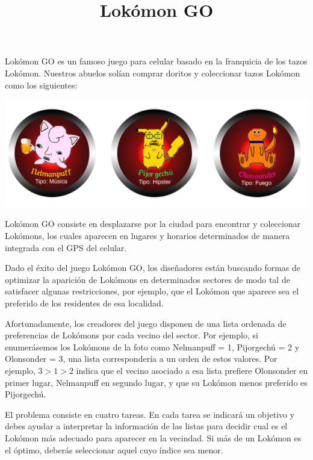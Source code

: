 \documentclass{oci}
\title{Lokómon GO}
\begin{document}
\begin{problemDescription}
Lok\'omon GO es un famoso juego para celular basado en la franquicia de los tazos Lok\'omon. Nuestros abuelos sol\'ian comprar doritos y coleccionar tazos Lok\'omon como los siguientes:

\begin{center}
	\includegraphics[scale=0.4]{lokomons.jpg}
\end{center}

Lok\'omon GO consiste en desplazarse por la ciudad para encontrar y coleccionar Lok\'omons, los cuales aparecen en lugares y horarios determinados de manera integrada con el GPS del celular.

Dado el \'exito del juego Lok\'omon GO, los dise\~nadores est\'an buscando formas de optimizar la aparici\'on de Lok\'omons en determinados sectores de modo tal de satisfacer algunas restricciones, por ejemplo, que el Lok\'omon que aparece sea el preferido de los residentes de esa localidad.

Afortunadamente, los creadores del juego disponen de una lista ordenada de preferencias de Lok\'omons por cada vecino del sector. Por ejemplo, si enumer\'asemos los Lok\'omons de la foto como Nelmanpuff = 1, Pijorgech\'u = 2 y Olonsonder = 3, una lista corresponder\'ia a un orden de estos valores. Por ejemplo, $3 > 1 > 2$ indica que el vecino asociado a esa lista prefiere Olonsonder en primer lugar, Nelmanpuff en segundo lugar, y que su Lok\'omon menos preferido es Pijorgech\'u.

El problema consiste en cuatro tareas. En cada tarea se indicar\'a un objetivo y debes ayudar a interpretar la informaci\'on de las listas para decidir cual es el Lok\'omon m\'as adecuado para aparecer en la vecindad. Si m\'as de un Lok\'omon es el \'optimo, deber\'as seleccionar aquel cuyo \'indice sea menor.
\end{problemDescription}
\end{document}
